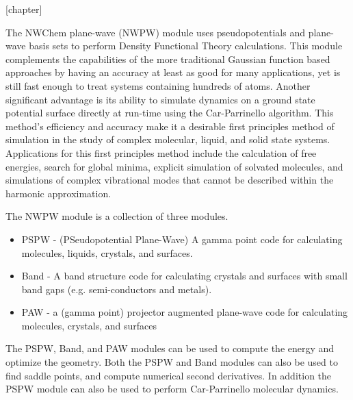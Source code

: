 %
%
\label{sec:pspw}

[chapter]
\def\thealgcounter{\thechapter.\arabic{algcounter}}
\newenvironment{algorithm}[1]
               { \refstepcounter{algcounter}
                \begin{center}
                  {\bf Algorithm} \thealgcounter: #1
                \end{center}
               \begin{center}\begin{enumerate} \begin{em}}
               {\end{em}\end{enumerate}\end{center}}
 

The NWChem plane-wave (NWPW) module uses pseudopotentials and
plane-wave basis sets to perform Density Functional Theory
calculations.  This module complements the capabilities of the more
traditional Gaussian function based approaches by having an accuracy at least as good 
for many applications, yet is still fast enough to treat systems containing hundreds of
atoms.  Another significant advantage is its ability to simulate
dynamics on a ground state potential surface directly at run-time
using the Car-Parrinello algorithm.  This method's efficiency and
accuracy make it a desirable first principles method of simulation in
the study of complex molecular, liquid, and solid state systems.
Applications for this first principles method include the calculation
of free energies, search for global minima, explicit simulation of
solvated molecules, and simulations of complex vibrational modes that
cannot be described within the harmonic  approximation.

The NWPW module is a collection of three modules.
\begin{itemize}
   \item PSPW - (PSeudopotential Plane-Wave) A gamma point code for
     calculating molecules, liquids, crystals, and  surfaces.  
   \item Band - A band structure code for calculating
     crystals and surfaces with small band gaps (e.g. semi-conductors
     and metals).
   \item PAW - a (gamma point) projector augmented plane-wave code
     for calculating molecules, crystals, and surfaces 
\end{itemize}
The PSPW, Band, and PAW modules can be used to compute the energy and  optimize the
geometry.  Both the PSPW and Band modules can also be used to find saddle points, and 
compute numerical second derivatives.  In addition the PSPW module can also be used 
to perform Car-Parrinello molecular  dynamics.

